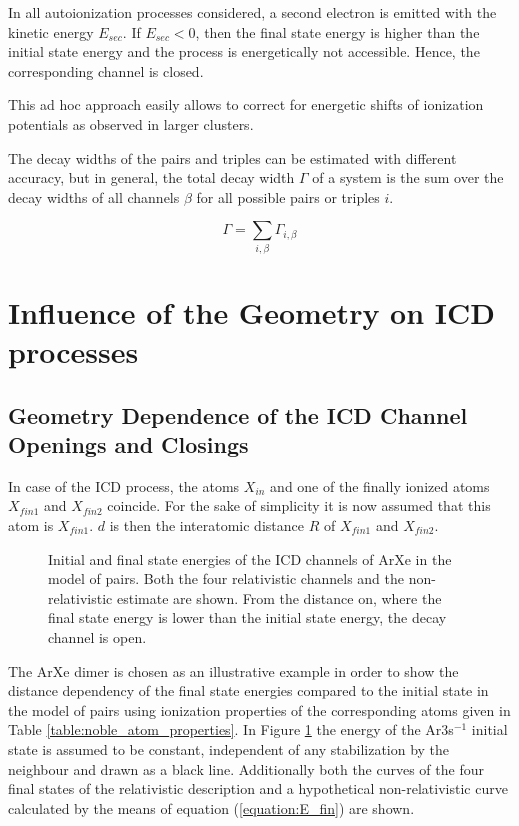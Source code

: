In all autoionization processes considered, a second electron
is emitted with the kinetic energy $E_{sec}$. If $E_{sec}<0$, then
the final state energy is higher than the initial state energy and the
process is energetically not accessible. Hence, the corresponding channel
is closed.

This ad hoc approach easily allows to correct for energetic shifts of
ionization potentials as observed in larger clusters.

The decay widths of the pairs and triples can be estimated with
different accuracy, but in general, the total decay width $\Gamma$ of
a system is the sum over the decay widths of all channels $\beta$ for
all possible pairs or triples $i$.

\begin{equation}
  \Gamma = \sum\limits_{i,\beta}\Gamma_{i,\beta}
\end{equation}


\section{Influence of the Geometry on ICD processes} \label{section:icd_geom}

\subsection{Geometry Dependence of the ICD Channel Openings and Closings}
In case of the \ac{ICD} process, the atoms $X_{in}$ and one of
the finally ionized atoms $X_{fin1}$ and $X_{fin2}$ coincide. For the sake of simplicity
it is now assumed that this atom is $X_{fin1}$. $d$ is then the interatomic distance
$R$ of $X_{fin1}$ and $X_{fin2}$.

\begin{figure}[h]
 \centering
 
 \caption{Initial and final state energies of the ICD channels of ArXe in the
          model of pairs. Both the four relativistic channels and
          the non-relativistic estimate are shown. From the distance on, where
          the final state energy is lower than the initial state energy, the
          decay channel is open.}
 \label{figure:ArXe_energy_curves_unshifted}
\end{figure}

The ArXe dimer is chosen as an illustrative example in order to show the distance
dependency of the final state energies compared to the initial state
in the model of pairs using
ionization properties of the corresponding atoms given in Table
\ref{table:noble_atom_properties}.
In Figure \ref{figure:ArXe_energy_curves_unshifted} the energy of
the Ar3s$^{-1}$ initial
state is assumed to be constant, independent of any stabilization by the
neighbour and drawn as a black line. Additionally both the
curves of the four final states of the relativistic description and
a hypothetical non-relativistic curve calculated by the means of
equation (\ref{equation:E_fin}) are shown.

